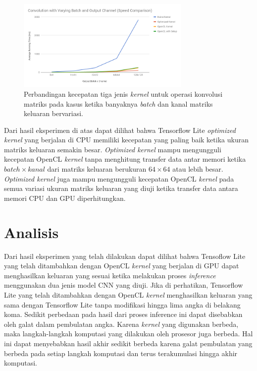 \begin{figure}
	\centering
	\includegraphics[width=0.75\textwidth]
	{pics/convvarbchn.png}
	\caption{Perbandingan kecepatan tiga jenis \textit{kernel} untuk operasi konvolusi matriks pada kasus ketika banyaknya \textit{batch} dan kanal matriks keluaran bervariasi.}
	\label{fig:convvarbchn}
\end{figure}

Dari hasil eksperimen di atas dapat dilihat bahwa Tensorflow Lite \textit{optimized kernel} yang berjalan di CPU memiliki kecepatan yang paling baik ketika ukuran matriks keluaran semakin besar. \textit{Optimized kernel} mampu mengungguli kecepatan OpenCL \textit{kernel} tanpa menghitung transfer data antar memori ketika $batch \times kanal$ dari matriks keluaran berukuran $64 \times 64$ atau lebih besar. \textit{Optimized kernel} juga mampu mengungguli kecepatan OpenCL \textit{kernel} pada semua variasi ukuran matriks keluaran yang diuji ketika transfer data antara memori CPU dan GPU diperhitungkan.

\section{Analisis }
Dari hasil eksperimen yang telah dilakukan dapat dilihat bahwa Tensoflow Lite yang telah ditambahkan dengan OpenCL \textit{kernel} yang berjalan di GPU dapat menghasilkan keluaran yang sesuai ketika melakukan proses \textit{inference} menggunakan dua jenis model CNN yang diuji. Jika di perhatikan, Tensorflow Lite yang telah ditambahkan dengan OpenCL \textit{kernel} menghasilkan keluaran yang sama dengan Tensorflow Lite tanpa modifikasi hingga lima angka di belakang koma. Sedikit perbedaan pada hasil dari proses inference ini dapat disebabkan oleh galat dalam pembulatan angka. Karena \textit{kernel} yang digunakan berbeda, maka langkah-langkah komputasi yang dilakukan oleh prosesor juga berbeda. Hal ini dapat menyebabkan hasil akhir sedikit berbeda karena galat pembulatan yang berbeda pada setiap langkah komputasi dan terus terakumulasi hingga akhir komputasi.

